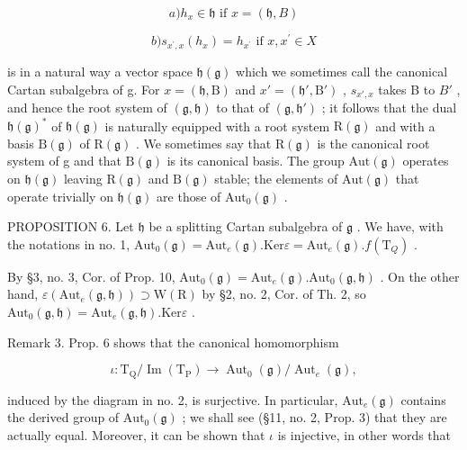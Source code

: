 \[
a) h _ {x} \in \mathfrak {h} \text {   if   } x = (\mathfrak {h}, B)
\]

\[
b) s _ {x ^ {\prime}, x} (h _ {x}) = h _ {x ^ {\prime}} \text { if } x, x ^ {\prime} \in X
\]

is in a natural way a vector space \(\mathfrak{h}(\mathfrak{g})\) which we sometimes call the canonical Cartan subalgebra of g. For \(x = (\mathfrak{h}, \mathrm{B})\) and \(x' = (\mathfrak{h}', \mathrm{B}')\) , \(s_{x', x}\) takes B to \(B'\) , and hence the root system of \((\mathfrak{g}, \mathfrak{h})\) to that of \((\mathfrak{g}, \mathfrak{h}')\) ; it follows that the dual \(\mathfrak{h}(\mathfrak{g})^*\) of \(\mathfrak{h}(\mathfrak{g})\) is naturally equipped with a root system \(\mathrm{R}(\mathfrak{g})\) and with a basis \(\mathrm{B}(\mathfrak{g})\) of \(\mathrm{R}(\mathfrak{g})\) . We sometimes say that \(\mathrm{R}(\mathfrak{g})\) is the canonical root system of g and that \(\mathrm{B}(\mathfrak{g})\) is its canonical basis. The group \(\mathrm{Aut}(\mathfrak{g})\) operates on \(\mathfrak{h}(\mathfrak{g})\) leaving \(\mathrm{R}(\mathfrak{g})\) and \(\mathrm{B}(\mathfrak{g})\) stable; the elements of \(\mathrm{Aut}(\mathfrak{g})\) that operate trivially on \(\mathfrak{h}(\mathfrak{g})\) are those of \(\mathrm{Aut}_0(\mathfrak{g})\) .

PROPOSITION 6. Let \(\mathfrak{h}\) be a splitting Cartan subalgebra of \(\mathfrak{g}\) . We have, with the notations in no. 1, \(\mathrm{Aut}_0(\mathfrak{g}) = \mathrm{Aut}_e(\mathfrak{g}).\mathrm{Ker}\varepsilon = \mathrm{Aut}_e(\mathfrak{g}).f(\mathrm{T}_Q)\) .

By §3, no. 3, Cor. of Prop. 10, \(\mathrm{Aut}_0(\mathfrak{g}) = \mathrm{Aut}_e(\mathfrak{g}).\mathrm{Aut}_0(\mathfrak{g},\mathfrak{h})\) . On the other hand, \(\varepsilon (\mathrm{Aut}_e(\mathfrak{g},\mathfrak{h}))\supset \mathrm{W}(\mathrm{R})\) by §2, no. 2, Cor. of Th. 2, so \(\mathrm{Aut}_0(\mathfrak{g},\mathfrak{h}) = \mathrm{Aut}_e(\mathfrak{g},\mathfrak{h}).\mathrm{Ker}\varepsilon\) .

Remark 3. Prop. 6 shows that the canonical homomorphism

\[
\iota : \mathrm{T} _ {\mathrm{Q}} / \operatorname{Im} (\mathrm{T} _ {\mathrm{P}}) \to \operatorname{Aut} _ {0} (\mathfrak {g}) / \operatorname{Aut} _ {e} (\mathfrak {g}),
\]

induced by the diagram in no. 2, is surjective. In particular, \(\mathrm{Aut}_e(\mathfrak{g})\) contains the derived group of \(\mathrm{Aut}_0(\mathfrak{g})\) ; we shall see (§11, no. 2, Prop. 3) that they are actually equal. Moreover, it can be shown that \(\iota\) is injective, in other words that

